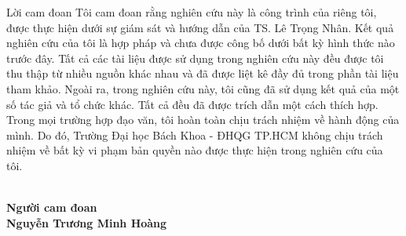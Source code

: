 \begin{preface}{Lời cam đoan}
  Tôi cam đoan rằng nghiên cứu này là công trình của riêng tôi, được thực hiện dưới sự giám sát và hướng dẫn của TS. Lê Trọng Nhân.
  Kết quả nghiên cứu của tôi là hợp pháp và chưa được công bố dưới bất kỳ hình thức nào trước đây.
  Tất cả các tài liệu được sử dụng trong nghiên cứu này đều được tôi thu thập từ nhiều nguồn khác nhau và đã được liệt kê đầy đủ trong phần tài liệu tham khảo.
  Ngoài ra, trong nghiên cứu này, tôi cũng đã sử dụng kết quả của một số tác giả và tổ chức khác.
  Tất cả đều đã được trích dẫn một cách thích hợp.
  Trong mọi trường hợp đạo văn, tôi hoàn toàn chịu trách nhiệm về hành động của mình.
  Do đó, Trường Đại học Bách Khoa - ĐHQG TP.HCM không chịu trách nhiệm về bất kỳ vi phạm bản quyền nào được thực hiện trong nghiên cứu của tôi.

  \vspace*{\fill}
  \noindent\hfill
  \begin{minipage}{0.50\textwidth}
    \centering
    \\[1cm]
    \textbf{Người cam đoan}\\[2.5cm]
    \textbf{Nguyễn Trương Minh Hoàng}
  \end{minipage}
\end{preface}
